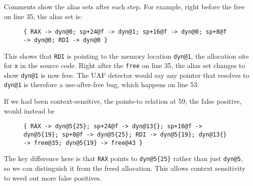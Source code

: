 Comments show the alias sets after each step.
For example, right before the free on line 35, the alias set is:

\begin{figure}[h!]
\texttt{\{ RAX -> dyn@0; sp+24@f -> dyn@1;
    sp+16@f -> dyn@0; sp+8@f -> dyn@0;
    RDI -> dyn@0 \}}
\end{figure}

This shows that \texttt{RDI} is pointing to the memory location \texttt{dyn@1}, the allocation site for \texttt{x} in the source code.
Right after the \texttt{free} on line 35, the alias set changes to show \texttt{dyn@1} is now free.
The UAF detector would say any pointer that resolves to \texttt{dyn@1} is therefore a use-after-free bug, which happens on
line 53.

If we had been context-sensitive, the points-to relation at 59, the false positive, would instead be
\begin{figure}[h!]
\texttt{\{ RAX -> dyn@5\{25\}; sp+24@f -> dyn@13\{\};
    sp+16@f -> dyn@5\{19\}; sp+8@f -> dyn@5\{25\};
    RDI -> dyn@5\{19\}; dyn@13\{\} -> free@35;
    dyn@5\{19\} -> free@43 \}}
\end{figure}

The key difference here is that \texttt{RAX} points to \texttt{dyn@5\{25\}} rather than just \texttt{dyn@5}, so we can distinguish it from the freed allocation.
This allows context sensitivity to weed out more false positives.
